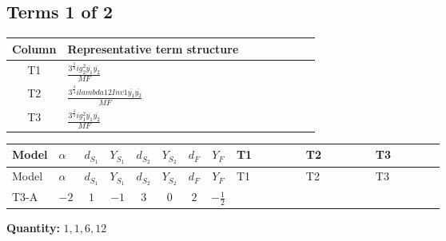 \documentclass[8pt]{article}
\begin{document}
\begin{landscape}
\subsection*{Terms 1 of 2}
\begin{center}
\begin{tabular}{@{}c >{\raggedright\arraybackslash}p{0.82\linewidth}@{}}
\toprule
Column & Representative term structure \\
\midrule
T1 & \(\displaystyle \frac{3^{\frac{3}{4}} i g_{2}^{2} \overline{y_{1}} \overline{y_{2}}}{MF}\) \\
\midrule
T2 & \(\displaystyle \frac{3^{\frac{3}{4}} i lambda12Inv1 \overline{y_{1}} \overline{y_{2}}}{MF}\) \\
\midrule
T3 & \(\displaystyle \frac{3^{\frac{3}{4}} i g_{1}^{2} \overline{y_{1}} \overline{y_{2}}}{MF}\) \\
\midrule
\bottomrule
\end{tabular}
\end{center}
\smallskip
\tiny
\begin{longtable}{@{}llcccccc >{\raggedright\arraybackslash}p{0.21\linewidth} >{\raggedright\arraybackslash}p{0.21\linewidth} >{\raggedright\arraybackslash}p{0.21\linewidth}@{}}
\toprule
Model & $\alpha$ & $d_{S_1}$ & $Y_{S_1}$ & $d_{S_2}$ & $Y_{S_2}$ & $d_F$ & $Y_F$ & T1 & T2 & T3 \\
\midrule
\endfirsthead
\toprule
Model & $\alpha$ & $d_{S_1}$ & $Y_{S_1}$ & $d_{S_2}$ & $Y_{S_2}$ & $d_F$ & $Y_F$ & T1 & T2 & T3 \\
\midrule
\endhead
T3-A & $-2$ & $1$ & $-1$ & $3$ & $0$ & $2$ & $-\frac{1}{2}$ & \scriptsize\adjustbox{max width=\linewidth}{$\begin{gathered} - \frac{17 \cdot 3^{\frac{3}{4}} i g_{2}^{2} \overline{y_{1}} \overline{y_{2}}}{24 MF}\end{gathered}$} & \scriptsize\adjustbox{max width=\linewidth}{$\begin{gathered} - \frac{3^{\frac{3}{4}} i lambda12Inv1 \overline{y_{1}} \overline{y_{2}}}{6 MF}\end{gathered}$} & \scriptsize\adjustbox{max width=\linewidth}{$\begin{gathered} - \frac{3^{\frac{3}{4}} i g_{1}^{2} \overline{y_{1}} \overline{y_{2}}}{8 MF}\end{gathered}$} \\
\midrule
\bottomrule
\end{longtable}
\clearpage
\noindent\textbf{Quantity: }$\mathrm{1,1,6,12}$\par\smallskip

\end{landscape}
\end{document}
